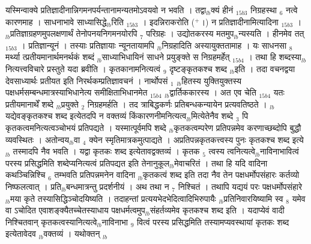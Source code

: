 \documentclass[article,12pt,a4paper]{memoir}%
\newcommand{\add}[1]{($^{+}$#1)}
\begin{document}
	  
	  \pstart \leavevmode%
	\hphantom{.}{\color{DodgerBlue3}यस्मिन्वाक्ये प्रतिज्ञादीनान्निगमनपर्यन्तानामन्यतमोऽवयवो न भवति । तद्वा{\tiny $_{lb}$}क्यं हीनं} {\tiny $_{15b3}$} निग्रहस्था {\tiny $_{6}$} नत्वे कारणमाह । {\color{DodgerBlue3}साधनाभावे साध्यासिद्धे{\tiny $_{lb}$}रिति} {\tiny $_{15b3}$} । इदन्निराकरोति \add{।} न {\color{DodgerBlue3}प्रतिज्ञादीनामित्यादिना} {\tiny $_{15b3}$} । {\tiny $_{lb}$}प्रतिज्ञाग्रहणमुपलक्षणार्थं तेनोपनयनिगमनयोरपि {\tiny $_{7}$} परिग्रहः । {\color{DodgerBlue3}उद्योतकरस्य} मतमुप{\tiny $_{lb}$}न्यस्यति । {\color{DodgerBlue3}हीनमेव तत्} {\tiny $_{15b3}$} । प्रतिज्ञान्यूनं । तस्याः प्रतिज्ञायाः न्यूनतायामपि {\tiny $_{lb}$}निग्रहादिति अस्यायुक्ततामाह । {\color{DodgerBlue3}यः} साधनसा {\tiny $_{8}$} मर्थ्या {\color{DodgerBlue3}त्प्रतीयमानार्थमनर्थकं शब्दं} {\tiny $_{lb}$}साध्याभिधायिनं साधने {\color{DodgerBlue3}प्रयुङ्क्ते स निग्रहमर्हेत्} {\tiny $_{15b4}$} । तथा हि शब्दस्या{\tiny $_{lb}$}नित्यत्त्वविचारे प्रस्तुते यदा ब्रवीति । कृतकानामनित्यत्वं {\tiny $_{9}$} \leavevmode{} दृष्टङ्कृतकश्च शब्द {\tiny $_{lb}$}इति । तदा वचनद्वया देवसाध्यार्थः प्रतीयत इति निरर्थकम्प्रतिज्ञावचनं । नार्थोपसं {\tiny $_{1}$} {\tiny $_{lb}$}हितस्य युक्तियुक्तस्य पक्षधर्मसम्बन्धमात्रस्याभिधानेत्य {\color{DodgerBlue3}समीक्षिताभिधानमेत} {\tiny $_{15b4}$} {\tiny $_{lb}$}द्वार्तिककारस्य । अत एव चेति {\tiny $_{15b4}$} यतः प्रतीयमानार्थें शब्दे {\tiny $_{lb}$}प्रयुक्ते {\tiny $_{2}$} निग्रहमर्हति । तद {\color{DodgerBlue3}त्राबिद्धकर्णः} प्रतिबन्धकन्यायेन प्रत्यवतिष्ठते । {\tiny $_{lb}$}यद्येवङ्कृतकश्च शब्द इत्येतदपि न वक्तव्यं किंकारणनीमनित्यत्व{\tiny $_{lb}$}मित्येतेनैव शब्दे {\tiny $_{3}$} पि कृतकत्वमनित्यत्वञ्चोभयं प्रतिपद्यते । यस्मात्पूर्वमपि शब्दे {\tiny $_{lb}$}कृतकत्वम्परेण प्रतिपन्नमेव करणाच्छब्दोपि बुद्धौ व्यवस्थितः । अतोन्वय{\tiny $_{lb}$}वा {\tiny $_{4}$} क्येन स्मृतिमात्रकमुत्पाद्यते । अप्रतिपन्नकृतकत्त्वस्य पुनः कृतकश्च शब्द इत्ये{\tiny $_{lb}$} \leavevmode{} तस्मादपि नैव भवति । यद्वा कृतकः शब्द इत्येतावद्वक्तव्यं । कृतक {\tiny $_{5}$} त्वस्य त्वनित्यत्वे{\tiny $_{lb}$}नाविनाभावित्वं परस्य प्रसिद्धमिति शब्देप्यनित्यत्वं प्रतिपद्यत इति तेनानुकूल{\tiny $_{lb}$}मेवाचरितं । तथा हि यदि वादिना कथञ्चिन्निश्चि {\tiny $_{6}$} तम्भवति प्रतिपन्नमनेन वादिना {\tiny $_{lb}$}कृतकत्वं शब्द इति तदा नैव तेन पक्षधर्मोपसंहारः कर्तव्यो निष्फलत्वात् । प्रति{\tiny $_{lb}$}बन्धमात्रन्तु प्रदर्शनीयं । अथ तथा न {\tiny $_{7}$} निश्चितं । तथापि यद्ययं परः पक्षधर्मोपसंहारे {\tiny $_{lb}$}मया कृते तस्यासिद्धिञ्चोदयिष्यति । तदाहन्तां प्रत्ययभेदभेदित्वादिभिरुपायैः {\tiny $_{lb}$}प्रतिनिवारयिष्यामि स्व {\tiny $_{8}$} यमेव वा ऽचोदित एवाशङ्क्यैतच्चेतस्याधाय पक्षधर्मत्वमुप{\tiny $_{lb}$}संहर्तव्यमेव कृतकश्च शब्द इति । यदाप्येवं वादी निश्चितवान् कृतकत्वस्यानित्यत्वे{\tiny $_{lb}$}नाविनाभा {\tiny $_{9}$} \leavevmode{} वित्वं परस्य प्रसिद्धमिति तस्यामप्यवस्थायां कृतकः शब्द इत्येतावेदव {\tiny $_{lb}$}वक्तव्यं । यथोक्तन् {\tiny $_{lb}$} 
	    \pend%
	  
\end{document}
